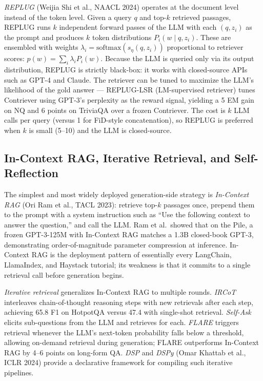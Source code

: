 \documentclass{article}
\begin{document}
\emph{REPLUG} (Weijia Shi et al., NAACL 2024) operates at the document level instead of the token level. Given a query \(q\) and top-\(k\) retrieved passages, REPLUG runs \(k\) independent forward passes of the LLM with each \((q, z_i)\) as the prompt and produces \(k\) token distributions \(P_i(w \mid q, z_i)\). These are ensembled with weights \(\lambda_i = \text{softmax}(s_\eta(q, z_i))\) proportional to retriever scores: \(p(w) = \sum_i \lambda_i P_i(w)\). Because the LLM is queried only via its output distribution, REPLUG is strictly black-box: it works with closed-source APIs such as GPT-4 and Claude. The retriever can be tuned to maximize the LLM's likelihood of the gold answer --- REPLUG-LSR (LM-supervised retriever) tunes Contriever using GPT-3's perplexity as the reward signal, yielding a 5 EM gain on NQ and 6 points on TriviaQA over a frozen Contriever. The cost is \(k\) LLM calls per query (versus 1 for FiD-style concatenation), so REPLUG is preferred when \(k\) is small (5--10) and the LLM is closed-source.

\subsection{In-Context RAG, Iterative Retrieval, and Self-Reflection}\label{in-context-rag-iterative-retrieval-and-self-reflection}

The simplest and most widely deployed generation-side strategy is \emph{In-Context RAG} (Ori Ram et al., TACL 2023): retrieve top-\(k\) passages once, prepend them to the prompt with a system instruction such as ``Use the following context to answer the question,'' and call the LLM. Ram et al.~showed that on the Pile, a frozen GPT-3-125M with In-Context RAG matches a 1.3B closed-book GPT-3, demonstrating order-of-magnitude parameter compression at inference. In-Context RAG is the deployment pattern of essentially every LangChain, LlamaIndex, and Haystack tutorial; its weakness is that it commits to a single retrieval call before generation begins.

\emph{Iterative retrieval} generalizes In-Context RAG to multiple rounds. \emph{IRCoT} \citep{trivedi2023interleavingretrie} interleaves chain-of-thought reasoning steps with new retrievals after each step, achieving 65.8 F1 on HotpotQA versus 47.4 with single-shot retrieval. \emph{Self-Ask} \citep{press2023measuringandnarrow} elicits sub-questions from the LLM and retrieves for each. \emph{FLARE} \citep{jiang2023activeretrievalaug} triggers retrieval whenever the LLM's next-token probability falls below a threshold, allowing on-demand retrieval during generation; FLARE outperforms In-Context RAG by 4--6 points on long-form QA. \emph{DSP} and \emph{DSPy} (Omar Khattab et al., ICLR 2024) provide a declarative framework for compiling such iterative pipelines.
\end{document}
